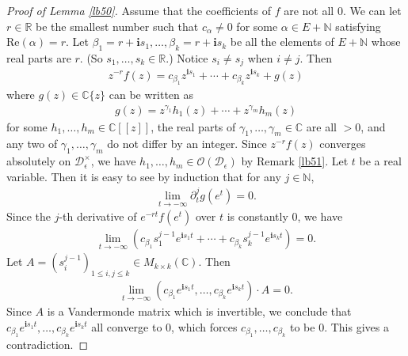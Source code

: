 \documentclass[12pt,a4paper,notitlepage]{article}
\theoremstyle{definition}
\theoremstyle{plain}
\newcommand{\mc}{\mathcal}
\newcommand{\scr}{\mathscr}
\newcommand{\im}{\mathbf{i}}
\newcommand{\Cbb}{\mathbb C}
\newcommand{\Nbb}{\mathbb N}
\newcommand{\Rbb}{\mathbb R}
\numberwithin{equation}{section}
\begin{document}
\begin{proof}[Proof of Lemma \ref{lb50}]
	Assume that the coefficients of $f$ are not all $0$. We can let $r\in\Rbb$ be the smallest number such that $c_\alpha\neq 0$ for some $\alpha\in E+\Nbb$ satisfying $\mathrm{Re}(\alpha)=r$. Let $\beta_1=r+\im s_1,\dots,\beta_k=r+\im s_k$ be all the elements of $E+\Nbb$ whose real parts are $r$. (So $s_1,\dots,s_k\in\Rbb$.) Notice $s_i\neq s_j$ when $i\neq j$. Then 
	\begin{align*}
	z^{-r}f(z)=c_{\beta_1}z^{\im s_1}+\cdots +c_{\beta_k}z^{\im s_k}+g(z)
	\end{align*}
	where $g(z)\in\Cbb\{z\}$ can be written as
	\begin{align*}
	g(z)=z^{\gamma_1}h_1(z)+\cdots+z^{\gamma_m}h_m(z)
	\end{align*}
	for some $h_1,\dots,h_m\in\Cbb[[z]]$,  the real parts of $\gamma_1,\dots,\gamma_m\in\Cbb$ are all $>0$, and any two of $\gamma_1,\dots,\gamma_m$ do not differ by an integer. Since $z^{-r}f(z)$ converges absolutely on $\mc D_\epsilon^\times$, we have $h_1,\dots,h_m\in\scr O(\mc D_\epsilon)$ by Remark \ref{lb51}. Let $t$ be a real variable.  Then it is easy to see by induction  that for any $j\in\Nbb$,
	\begin{align*}
	\lim_{t\rightarrow-\infty}\partial_t^jg(e^t)=0.
	\end{align*}
	Since the $j$-th derivative of $e^{-rt}f(e^t)$ over $t$ is constantly $0$, we have
	\begin{align*}
	\lim_{t\rightarrow-\infty}(c_{\beta_1}s_1^{j-1}e^{\im s_1 t}+\cdots +c_{\beta_k}s_k^{j-1}e^{\im s_k t})=0.
	\end{align*}
	Let $A=(s_i^{j-1})_{1\leq i,j\leq k}\in M_{k\times k}(\Cbb)$.  Then
	\begin{align*}
	\lim_{t\rightarrow-\infty} (c_{\beta_1} e^{\im s_1t},\dots,c_{\beta_k} e^{\im s_k t})\cdot A=0.
	\end{align*} 
	Since $A$ is a Vandermonde matrix which is invertible, we conclude that $c_{\beta_1} e^{\im s_1t},\dots,c_{\beta_k} e^{\im s_k t}$ all converge to $0$, which forces $c_{\beta_1},\dots,c_{\beta_k}$ to be $0$. This gives a contradiction.
\end{proof}
\end{document}
